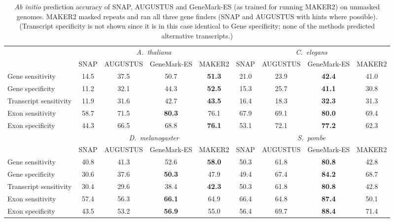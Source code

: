 \documentclass[a4paper,10pt]{report}
\begin{document}
\begin{table}
\begin{center}
 \begin{scriptsize}
 \begin{tabular}{|l|cccc|cccc|}
 \hline
& \multicolumn{4}{|c|}{\textit{A.~thaliana}} & \multicolumn{4}{|c|}{\textit{C.~elegans}}\\
& SNAP & AUGUSTUS & GeneMark-ES & MAKER2 & SNAP & AUGUSTUS & GeneMark-ES & MAKER2\\
\hline
Gene sensitivity        & 14.5 & 37.5 & 50.7 & \textbf{51.3} & 21.0 & 23.9 & \textbf{42.4} & 41.0\\
Gene specificity        & 11.2 & 32.1 & 44.3 & \textbf{52.5} & 15.3 & 25.7 & \textbf{41.1} & 30.8\\
Transcript sensitivity  & 11.9 & 31.6 & 42.7 & \textbf{43.5} & 16.4 & 18.3 & \textbf{32.3} & 31.3\\
Exon sensitivity        & 58.7 & 71.5 & \textbf{80.3} & 76.1 & 67.9 & 69.1 & \textbf{80.0} & 69.4\\
Exon specificity        & 44.3 & 66.5 & 68.8 & \textbf{76.1} & 53.1 & 72.1 & \textbf{77.2} & 62.3\\
\hline
& \multicolumn{4}{|c|}{\textit{D.~melanogaster}} & \multicolumn{4}{|c|}{\textit{S.~pombe}}\\
& SNAP & AUGUSTUS & GeneMark-ES & MAKER2 & SNAP & AUGUSTUS & GeneMark-ES & MAKER2\\
\hline
Gene sensitivity       & 40.8 & 41.3 & 52.6 & \textbf{58.0} & 50.3 & 61.8 & \textbf{80.8} & 42.8\\
Gene specificity       & 30.6 & 37.6 & \textbf{50.3} & 47.9 & 49.4 & 67.4 & \textbf{84.2} & 68.7\\
Transcript sensitivity & 30.4 & 29.6 & 38.4 & \textbf{42.3} & 50.3 & 61.8 & \textbf{80.8} & 42.8\\
Exon sensitivity       & 57.4 & 56.3 & \textbf{66.1} & 64.9 & 66.4 & 64.8 & \textbf{87.4} & 50.1\\
Exon specificity       & 43.5 & 53.2 & \textbf{56.9} & 55.0 & 56.4 & 69.7 & \textbf{88.4} & 71.4\\
\hline
 \end{tabular}
\end{scriptsize}
\end{center}
\caption{\textit{Ab initio} prediction accuracy of SNAP, AUGUSTUS and GeneMark-ES (as trained for running MAKER2) on unmasked genomes. MAKER2 masked repeats and ran all three gene finders (SNAP and AUGUSTUS with hints where possible). (Transcript specificity is not shown since it is in this case identical to Gene specificity; none of the methods predicted alternative transcripts.) \label{single_preds_maker}}
\end{table}
\end{document}
